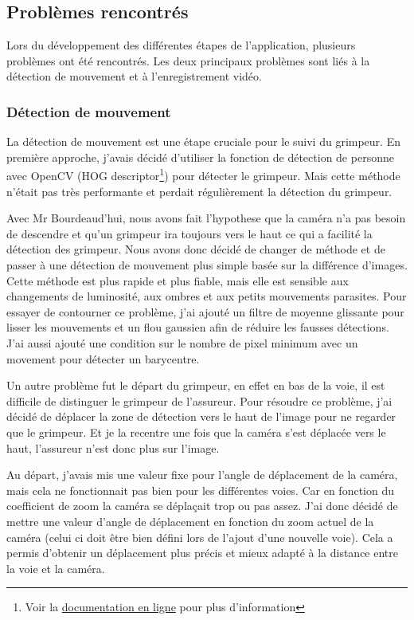 \documentclass[a4paper, 11pt, french]{article}
\begin{document}

\subsection{Problèmes rencontrés}
Lors du développement des différentes étapes de l'application, plusieurs problèmes ont été rencontrés. Les deux principaux problèmes sont liés à la détection de mouvement et à l'enregistrement vidéo.

\subsubsection{Détection de mouvement}
La détection de mouvement est une étape cruciale pour le suivi du grimpeur. En première approche, j'avais décidé d'utiliser la fonction de détection de personne avec OpenCV (HOG descriptor\footnote{Voir la \href{https://docs.opencv.org/3.4/d5/d33/structcv_1_1HOGDescriptor.html}{documentation en ligne} pour plus d'information}) pour détecter le grimpeur. Mais cette méthode n'était pas très performante et perdait régulièrement la détection du grimpeur. 

Avec Mr Bourdeaud'hui, nous avons fait l'hypothese que la caméra n'a pas besoin de descendre et qu'un grimpeur ira toujours vers le haut ce qui a facilité la détection des grimpeur. Nous avons donc décidé de changer de méthode et de passer à une détection de mouvement plus simple basée sur la différence d'images. Cette méthode est plus rapide et plus fiable, mais elle est sensible aux changements de luminosité, aux ombres et aux petits mouvements parasites. Pour essayer de contourner ce problème, j'ai ajouté un filtre de moyenne glissante pour lisser les mouvements et un flou gaussien afin de réduire les fausses détections. J'ai aussi ajouté une condition sur le nombre de pixel minimum avec un movement pour détecter un barycentre.

Un autre problème fut le départ du grimpeur, en effet en bas de la voie, il est difficile de distinguer le grimpeur de l'assureur. Pour résoudre ce problème, j'ai décidé de déplacer la zone de détection vers le haut de l'image pour ne regarder que le grimpeur. Et je la recentre une fois que la caméra s'est déplacée vers le haut, l'assureur n'est donc plus sur l'image.

Au départ, j'avais mis une valeur fixe pour l'angle de déplacement de la caméra, mais cela ne fonctionnait pas bien pour les différentes voies. Car en fonction du coefficient de zoom la caméra se déplaçait trop ou pas assez. J'ai donc décidé de mettre une valeur d'angle de déplacement en fonction du zoom actuel de la caméra (celui ci doit être bien défini lors de l'ajout d'une nouvelle voie). Cela a permis d'obtenir un déplacement plus précis et mieux adapté à la distance entre la voie et la caméra.
\end{document}
